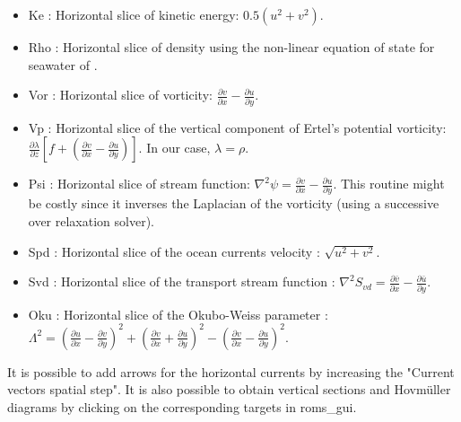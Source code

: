 \begin{itemize}
\item Ke : Horizontal slice of kinetic energy: $0.5(u^2+v^2)$.

\item Rho : Horizontal slice of density using the non-linear equation of state 
for seawater of \citet{Jac95}. 

\item Vor : Horizontal slice of vorticity: $\frac{\partial v}{\partial x}-
\frac{\partial u}{\partial y}$.

\item Vp : Horizontal slice of the vertical component of Ertel's potential vorticity:
$\frac{\partial \lambda}{\partial z} \left [ f + 
\left (\frac{\partial v}{\partial x}-\frac{\partial u}{\partial y}\right ) \right ]$.
In our case, $\lambda=\rho$.

\item Psi : Horizontal slice of stream function: 
$\nabla^2 \psi=\frac{\partial v}{\partial x}-\frac{\partial u}{\partial y}$.
This routine might be costly since it inverses the Laplacian of the vorticity
(using a successive over relaxation solver).

\item Spd : Horizontal slice of the ocean currents velocity : $\sqrt{u^2+v^2}$.

\item Svd : Horizontal slice of the transport stream function : 
$\nabla^2 S_{vd}=\frac{\partial \bar{v}}{\partial x}-\frac{\partial \bar{u}}{\partial y}$.


\item Oku : Horizontal slice of the Okubo-Weiss parameter : 
$\Lambda^2=
\left ( \frac{\partial u}{\partial x}-\frac{\partial v}{\partial y} \right )^2+
\left ( \frac{\partial v}{\partial x}+\frac{\partial u}{\partial y} \right )^2-
\left ( \frac{\partial v}{\partial x}-\frac{\partial u}{\partial y} \right )^2$.

\end{itemize}

It is possible to add arrows for the horizontal currents by increasing the "Current vectors 
spatial step". It is also possible to obtain vertical sections and 
Hovm\"uller diagrams by clicking on the corresponding targets in roms\_gui.

